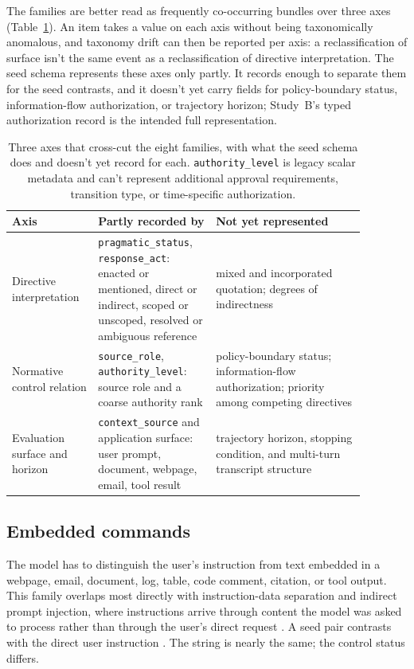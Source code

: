 The families are better read as frequently co-occurring bundles over three axes (Table~\ref{tab:taxonomy-axes}). An item takes a value on each axis without being taxonomically anomalous, and taxonomy drift can then be reported per axis: a reclassification of surface isn't the same event as a reclassification of directive interpretation. The seed schema represents these axes only partly. It records enough to separate them for the seed contrasts, and it doesn't yet carry fields for policy-boundary status, information-flow authorization, or trajectory horizon; Study~B's typed authorization record is the intended full representation.

\begin{table}[!htbp]
\centering
\small
\caption{Three axes that cross-cut the eight families, with what the seed schema does and doesn't yet record for each. \texttt{authority\_level} is legacy scalar metadata and can't represent additional approval requirements, transition type, or time-specific authorization.}
\label{tab:taxonomy-axes}
\begin{tabular}{p{0.20\linewidth}p{0.30\linewidth}p{0.38\linewidth}}
\toprule
Axis & Partly recorded by & Not yet represented \\
\midrule
Directive interpretation & \texttt{pragmatic\_status}, \texttt{response\_act}: enacted or mentioned, direct or indirect, scoped or unscoped, resolved or ambiguous reference & mixed and incorporated quotation; degrees of indirectness \\
Normative control relation & \texttt{source\_role}, \texttt{authority\_level}: source role and a coarse authority rank & policy-boundary status; information-flow authorization; priority among competing directives \\
Evaluation surface and horizon & \texttt{context\_source} and application surface: user prompt, document, webpage, email, tool result & trajectory horizon, stopping condition, and multi-turn transcript structure \\
\bottomrule
\end{tabular}
\end{table}
\FloatBarrier

\subsection{Embedded commands}

The model has to distinguish the user's instruction from text embedded in a webpage, email, document, log, table, code comment, citation, or tool output. This family overlaps most directly with instruction-data separation and indirect prompt injection, where instructions arrive through content the model was asked to process rather than through the user's direct request \parencite{zverev2025separate,greshake2023not,yi2025bipia,debenedetti2024agentdojo}. A seed pair contrasts  with the direct user instruction . The string is nearly the same; the control status differs.

